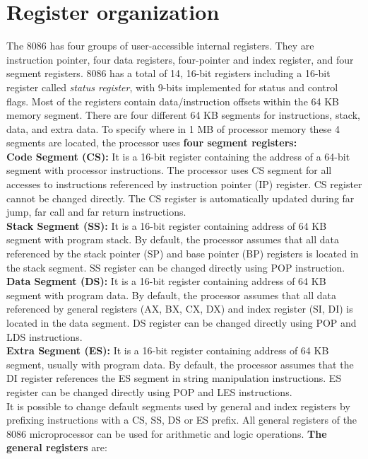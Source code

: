 \documentclass[12pt, a4paper]{scrartcl}
\begin{document}
\section{Register organization}
	The 8086 has four groups of user-accessible internal registers. They are instruction pointer, four data registers, four-pointer and index register, and four segment registers. 8086 has a total of 14, 16-bit registers including a 16-bit register called \textit{status register}, with 9-bits implemented for status and control flags. Most of the registers contain data/instruction offsets within the 64 KB memory segment. There are four different 64 KB segments for instructions, stack, data, and extra data. To specify where in 1 MB of processor memory these 4 segments are located, the processor uses \textbf{four segment registers:} \\

	\textbf{Code Segment (CS): }It is a 16-bit register containing the address of a 64-bit segment with processor instructions. The
	processor uses CS segment for all accesses to instructions
	referenced by instruction pointer (IP) register. CS register
	cannot be changed directly. The CS register is automatically updated during far jump, far call and far
	return instructions. \\

	\textbf{Stack Segment (SS): }It is a 16-bit register containing address of 64 KB segment with program stack. By default, the
	processor assumes that all data referenced by the stack	pointer (SP) and base pointer (BP) registers is located in
	the stack segment. SS register can be changed directly using POP instruction. \\

	\textbf{Data Segment (DS): }It is a 16-bit register containing address	of 64 KB segment with program data. By default, the
	processor assumes that all data referenced by general registers (AX, BX, CX, DX) and index register (SI, DI) is located in the data segment. DS register can be changed	directly using POP and LDS instructions. \\

	\textbf{Extra Segment (ES): }It is a 16-bit register containing address of 64 KB segment, usually with program data. By default,
	the processor assumes that the DI register references the
	ES segment in string manipulation instructions. ES register
	can be changed directly using POP and LES instructions. \\

	It is possible to change default segments used by general
	and index registers by prefixing instructions with a CS, SS,
	DS or ES prefix. All general registers of the 8086 microprocessor can be used for arithmetic and logic operations. \textbf{The general
		registers} are: \\
\end{document}

